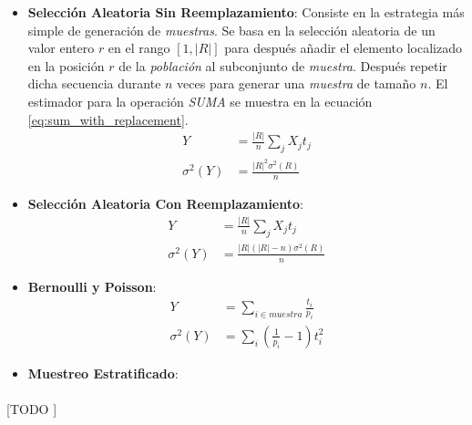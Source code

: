 \documentclass{subfiles}
\begin{document}
        \begin{itemize}

          \item \textbf{Selección Aleatoria Sin Reemplazamiento}: Consiste en la estrategia más simple de generación de \emph{muestras}. Se basa en la selección aleatoria de un valor entero $r$ en el rango $[1, |R|]$ para después añadir el elemento localizado en la posición $r$ de la \emph{población} al subconjunto de \emph{muestra}. Después repetir dicha secuencia durante $n$ veces para generar una \emph{muestra} de tamaño $n$. El estimador para la operación \emph{SUMA} se muestra en la ecuación \eqref{eq:sum_with_replacement}.
            \begin{align}
            \label{eq:sum_with_replacement}
              Y &= \frac{|R|}{n}\sum_jX_jt_j \\
            \label{eq:sum_with_replacement_deviation}
              \sigma^2(Y) &= \frac{|R|^2\sigma^2(R)}{n}
            \end{align}

          \item \textbf{Selección Aleatoria Con Reemplazamiento}:
            \begin{align}
            \label{eq:sum_without_replacement}
              Y &= \frac{|R|}{n}\sum_jX_jt_j \\
            \label{eq:sum_without_replacement_deviation}
              \sigma^2(Y) &= \frac{|R|(|R| - n)\sigma^2(R)}{n}
            \end{align}

          \item \textbf{Bernoulli y Poisson}:
            \begin{align}
            \label{eq:sum_bernoulli_poisson}
              Y &= \sum_{i \in muestra }\frac{t_i}{p_i} \\
            \label{eq:sum_bernoulli_poisson_deviation}
              \sigma^2(Y) &= \sum_i(\frac{1}{p_i}-1)t_i^2
            \end{align}

          \item \textbf{Muestreo Estratificado}:
            

        \end{itemize}

        \paragraph{}
        [TODO ]
\end{document}
